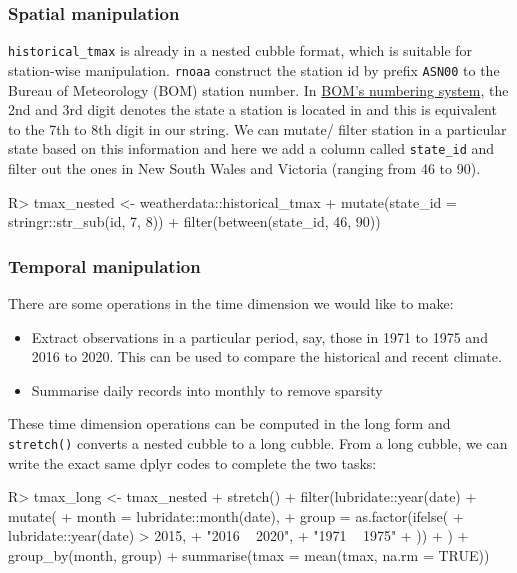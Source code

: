 \documentclass[
]{jss}
\providecommand{\tightlist}{%
  \setlength{\itemsep}{0pt}\setlength{\parskip}{0pt}}
\begin{document}
\hypertarget{spatial-manipulation}{%
\subsubsection{Spatial manipulation}\label{spatial-manipulation}}

\texttt{historical\_tmax} is already in a nested cubble format, which is
suitable for station-wise manipulation. \texttt{rnoaa} construct the
station id by prefix \texttt{ASN00} to the Bureau of Meteorology (BOM)
station number. In
\href{http://www.bom.gov.au/climate/cdo/about/site-num.shtml}{BOM's
numbering system}, the 2nd and 3rd digit denotes the state a station is
located in and this is equivalent to the 7th to 8th digit in our string.
We can mutate/ filter station in a particular state based on this
information and here we add a column called \texttt{state\_id} and
filter out the ones in New South Wales and Victoria (ranging from 46 to
90).

\begin{CodeChunk}
\begin{CodeInput}
R> tmax_nested <- weatherdata::historical_tmax %
+   mutate(state_id = stringr::str_sub(id, 7, 8)) %
+   filter(between(state_id, 46, 90))
\end{CodeInput}
\end{CodeChunk}

\hypertarget{temporal-manipulation}{%
\subsubsection{Temporal manipulation}\label{temporal-manipulation}}

There are some operations in the time dimension we would like to make:

\begin{itemize}
\tightlist
\item
  Extract observations in a particular period, say, those in 1971 to
  1975 and 2016 to 2020. This can be used to compare the historical and
  recent climate.
\item
  Summarise daily records into monthly to remove sparsity
\end{itemize}

These time dimension operations can be computed in the long form and
\texttt{stretch()} converts a nested cubble to a long cubble. From a
long cubble, we can write the exact same dplyr codes to complete the two
tasks:

\begin{CodeChunk}
\begin{CodeInput}
R> tmax_long <- tmax_nested %
+   stretch() %
+   filter(lubridate::year(date) %
+   mutate(
+     month = lubridate::month(date),
+     group = as.factor(ifelse(
+       lubridate::year(date) > 2015,
+       "2016 ~ 2020",
+       "1971 ~ 1975"
+     ))
+   ) %
+   group_by(month, group) %
+   summarise(tmax = mean(tmax, na.rm = TRUE))
\end{CodeInput}
\end{CodeChunk}
\end{document}
